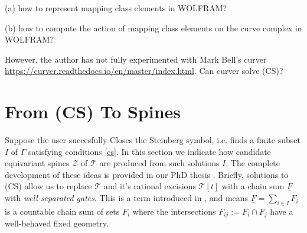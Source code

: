 \documentclass[12pt]{amsart}
\theoremstyle{definition}
\theoremstyle{remark}
\newcommand{\bZ}{\mathbb{Z}}
\newcommand{\uF}{\underline{F}}
\newcommand{\sT}{\mathscr{T}}
\newcommand{\sZ}{\mathscr{Z}}
\begin{document}
(a) how to represent mapping class elements in WOLFRAM?

(b) how to compute the action of mapping class elements on the curve complex in WOLFRAM? 

However, the author has not fully experimented with Mark Bell's curver \url{https://curver.readthedocs.io/en/master/index.html}. Can curver solve (CS)? 


















\section{From (CS) To Spines}
Suppose the user succesfully Closes the Steinberg symbol, i.e. finds a finite subset $I$ of $\Gamma$ satisfying conditions \ref{cs}. In this section we indicate how candidate equivariant spines $\sZ$ of $\sT$ are produced from such solutions $I$. The complete development of these ideas is provided in our PhD thesis \cite{martel}. Briefly, solutions to (CS) allow us to replace $\sT$ and it's rational excisions $\sT[t]$ with a chain sum $\uF$ with \textit{well-separated gates}. This is a term introduced in \cite{martel}, and means $\uF=\sum_{i\in I} F_i$ is a countable chain sum of sets $F_i$ where the intersections $F_{ij}:=F_i\cap F_j$ have a well-behaved fixed geometry.
\end{document}

